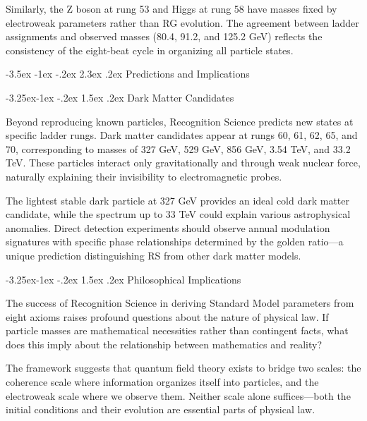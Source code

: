 \documentclass[11pt,a4paper]{article}
\makeatletter
\renewcommand\section{\@startsection{section}{1}{\z@}%
  {-3.5ex \@plus -1ex \@minus -.2ex}%
  {2.3ex \@plus.2ex}%
  {\normalfont\Large\bfseries\color{darkblue}}}
\renewcommand\subsection{\@startsection{subsection}{2}{\z@}%
  {-3.25ex\@plus -1ex \@minus -.2ex}%
  {1.5ex \@plus .2ex}%
  {\normalfont\large\bfseries\color{darkblue}}}
\theoremstyle{definition}
\makeatother
\begin{document}
Similarly, the Z boson at rung 53 and Higgs at rung 58 have masses fixed by electroweak parameters rather than RG evolution. The agreement between ladder assignments and observed masses (80.4, 91.2, and 125.2 GeV) reflects the consistency of the eight-beat cycle in organizing all particle states.

\section{Predictions and Implications}

\subsection{Dark Matter Candidates}

Beyond reproducing known particles, Recognition Science predicts new states at specific ladder rungs. Dark matter candidates appear at rungs 60, 61, 62, 65, and 70, corresponding to masses of 327 GeV, 529 GeV, 856 GeV, 3.54 TeV, and 33.2 TeV. These particles interact only gravitationally and through weak nuclear force, naturally explaining their invisibility to electromagnetic probes.

The lightest stable dark particle at 327 GeV provides an ideal cold dark matter candidate, while the spectrum up to 33 TeV could explain various astrophysical anomalies. Direct detection experiments should observe annual modulation signatures with specific phase relationships determined by the golden ratio—a unique prediction distinguishing RS from other dark matter models.

\subsection{Philosophical Implications}

The success of Recognition Science in deriving Standard Model parameters from eight axioms raises profound questions about the nature of physical law. If particle masses are mathematical necessities rather than contingent facts, what does this imply about the relationship between mathematics and reality?

The framework suggests that quantum field theory exists to bridge two scales: the coherence scale where information organizes itself into particles, and the electroweak scale where we observe them. Neither scale alone suffices—both the initial conditions and their evolution are essential parts of physical law.
\end{document}
